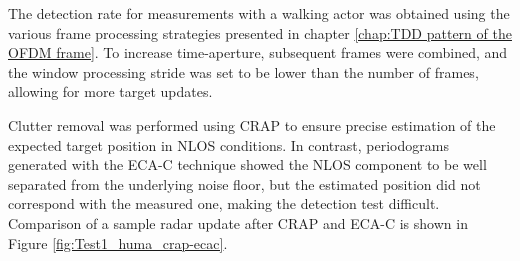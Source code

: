 The detection rate for measurements with a walking actor was obtained using the various frame processing strategies presented in chapter \ref{chap:TDD pattern of the OFDM frame}. To increase time-aperture, subsequent frames were combined, and the window processing stride was set to be lower than the number 
of frames, allowing for more target updates.

Clutter removal was performed using CRAP to ensure precise estimation of the expected target position in NLOS conditions. In contrast, periodograms generated with the ECA-C technique showed the NLOS component to be well separated from the underlying noise floor, but the estimated position did not correspond with the measured one, making the detection test difficult. Comparison of a sample radar update after CRAP and ECA-C is shown in Figure \ref{fig:Test1_huma_crap-ecac}.

